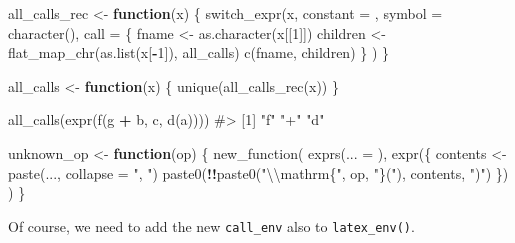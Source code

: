 \documentclass[
]{krantz}
\makeatletter
\newenvironment{Shaded}{\begin{snugshade}}{\end{snugshade}}
\newcommand{\CharTok}[1]{\textcolor[rgb]{0.31,0.60,0.02}{#1}}
\newcommand{\CommentTok}[1]{\textcolor[rgb]{0.56,0.35,0.01}{\textit{#1}}}
\newcommand{\ControlFlowTok}[1]{\textcolor[rgb]{0.13,0.29,0.53}{\textbf{#1}}}
\newcommand{\DataTypeTok}[1]{\textcolor[rgb]{0.13,0.29,0.53}{#1}}
\newcommand{\DecValTok}[1]{\textcolor[rgb]{0.00,0.00,0.81}{#1}}
\newcommand{\KeywordTok}[1]{\textcolor[rgb]{0.13,0.29,0.53}{\textbf{#1}}}
\newcommand{\NormalTok}[1]{#1}
\newcommand{\OperatorTok}[1]{\textcolor[rgb]{0.81,0.36,0.00}{\textbf{#1}}}
\newcommand{\StringTok}[1]{\textcolor[rgb]{0.31,0.60,0.02}{#1}}
\newenvironment{kframe}{%
\medskip{}
\setlength{\fboxsep}{.8em}
 \def\at@end@of@kframe{}%
 \ifinner\ifhmode%
  \def\at@end@of@kframe{\end{minipage}}%
  \begin{minipage}{\columnwidth}%
 \fi\fi%
 \def\FrameCommand##1{\hskip\@totalleftmargin \hskip-\fboxsep
 \colorbox{shadecolor}{##1}\hskip-\fboxsep
     \hskip-\linewidth \hskip-\@totalleftmargin \hskip\columnwidth}%
 \MakeFramed {\advance\hsize-\width
   \@totalleftmargin\z@ \linewidth\hsize
   \@setminipage}}%
 {\par\unskip\endMakeFramed%
 \at@end@of@kframe}
\renewenvironment{Shaded}{\begin{kframe}}{\end{kframe}}
\renewcommand{\KeywordTok} [1]{\textcolor[rgb]{0.00,0.44,0.13}{{#1}}}
\renewcommand{\DataTypeTok}[1]{\textcolor[rgb]{0.56,0.13,0.00}{{#1}}}
\renewcommand{\DecValTok}  [1]{\textcolor[rgb]{0.25,0.63,0.44}{{#1}}}
\renewcommand{\CharTok}    [1]{\textcolor[rgb]{0.25,0.44,0.63}{{#1}}}
\renewcommand{\StringTok}  [1]{\textcolor[rgb]{0.25,0.44,0.63}{{#1}}}
\renewcommand{\CommentTok} [1]{\textcolor[rgb]{0.38,0.63,0.69}{{#1}}}
\renewcommand{\NormalTok}  [1]{{#1}}
\makeatother
\begin{document}
\begin{Shaded}
\begin{Highlighting}[]
\NormalTok{all_calls_rec <-}\StringTok{ }\ControlFlowTok{function}\NormalTok{(x) \{}
  \KeywordTok{switch_expr}\NormalTok{(x,}
              \DataTypeTok{constant =}\NormalTok{ ,}
              \DataTypeTok{symbol =}   \KeywordTok{character}\NormalTok{(),}
              \DataTypeTok{call =}\NormalTok{ \{}
\NormalTok{                fname <-}\StringTok{ }\KeywordTok{as.character}\NormalTok{(x[[}\DecValTok{1}\NormalTok{]])}
\NormalTok{                children <-}\StringTok{ }\KeywordTok{flat_map_chr}\NormalTok{(}\KeywordTok{as.list}\NormalTok{(x[}\OperatorTok{-}\DecValTok{1}\NormalTok{]), all_calls)}
                \KeywordTok{c}\NormalTok{(fname, children)}
\NormalTok{              \}}
\NormalTok{  )}
\NormalTok{\}}

\NormalTok{all_calls <-}\StringTok{ }\ControlFlowTok{function}\NormalTok{(x) \{}
  \KeywordTok{unique}\NormalTok{(}\KeywordTok{all_calls_rec}\NormalTok{(x))}
\NormalTok{\}}

\KeywordTok{all_calls}\NormalTok{(}\KeywordTok{expr}\NormalTok{(}\KeywordTok{f}\NormalTok{(g }\OperatorTok{+}\StringTok{ }\NormalTok{b, c, }\KeywordTok{d}\NormalTok{(a))))}
\CommentTok{#> [1] "f" "+" "d"}

\NormalTok{unknown_op <-}\StringTok{ }\ControlFlowTok{function}\NormalTok{(op) \{}
  \KeywordTok{new_function}\NormalTok{(}
    \KeywordTok{exprs}\NormalTok{(}\DataTypeTok{... =}\NormalTok{ ),}
    \KeywordTok{expr}\NormalTok{(\{}
\NormalTok{      contents <-}\StringTok{ }\KeywordTok{paste}\NormalTok{(..., }\DataTypeTok{collapse =} \StringTok{", "}\NormalTok{)}
      \KeywordTok{paste0}\NormalTok{(}\OperatorTok{!!}\KeywordTok{paste0}\NormalTok{(}\StringTok{"}\CharTok{\textbackslash{}\textbackslash{}}\StringTok{mathrm\{"}\NormalTok{, op, }\StringTok{"\}("}\NormalTok{), contents, }\StringTok{")"}\NormalTok{)}
\NormalTok{    \})}
\NormalTok{  )}
\NormalTok{\}}
\end{Highlighting}
\end{Shaded}

Of course, we need to add the new \texttt{call\_env} also to \texttt{latex\_env()}.
\end{document}
